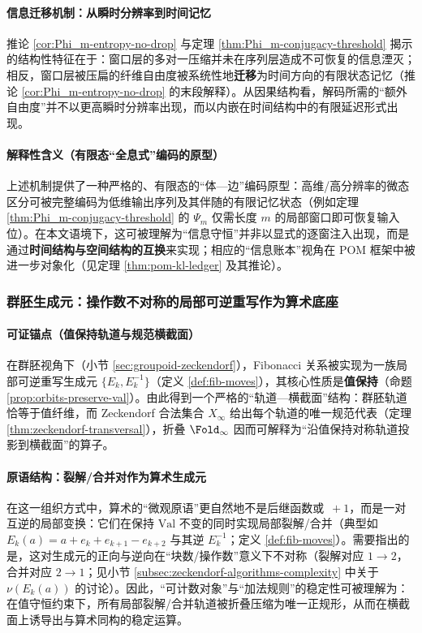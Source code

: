 \paragraph{信息迁移机制：从瞬时分辨率到时间记忆}
推论 \ref{cor:Phi_m-entropy-no-drop} 与定理 \ref{thm:Phi_m-conjugacy-threshold} 揭示的结构性特征在于：窗口层的多对一压缩并未在序列层造成不可恢复的信息湮灭；相反，窗口层被压扁的纤维自由度被系统性地\textbf{迁移}为时间方向的有限状态记忆（推论 \ref{cor:Phi_m-entropy-no-drop} 的末段解释）。从因果结构看，解码所需的“额外自由度”并不以更高瞬时分辨率出现，而以内嵌在时间结构中的有限延迟形式出现。

\paragraph{解释性含义（有限态“全息式”编码的原型）}
上述机制提供了一种严格的、有限态的“体—边”编码原型：高维/高分辨率的微态区分可被完整编码为低维输出序列及其伴随的有限记忆状态（例如定理 \ref{thm:Phi_m-conjugacy-threshold} 的 \(\Psi_m\) 仅需长度 \(m\) 的局部窗口即可恢复输入位）。在本文语境下，这可被理解为“信息守恒”并非以显式的逐窗注入出现，而是通过\textbf{时间结构与空间结构的互换}来实现；相应的“信息账本”视角在 POM 框架中被进一步对象化（见定理 \ref{thm:pom-kl-ledger} 及其推论）。

\subsubsection{群胚生成元：操作数不对称的局部可逆重写作为算术底座}\label{subsubsec:insight-groupoid-generators}
\paragraph{可证锚点（值保持轨道与规范横截面）}
在群胚视角下（小节 \ref{sec:groupoid-zeckendorf}），Fibonacci 关系被实现为一族局部可逆重写生成元 \(\{E_k,E_k^{-1}\}\)（定义 \ref{def:fib-moves}），其核心性质是\textbf{值保持}（命题 \ref{prop:orbits-preserve-val}）。由此得到一个严格的“轨道—横截面”结构：群胚轨道恰等于值纤维，而 Zeckendorf 合法集合 \(X_\infty\) 给出每个轨道的唯一规范代表（定理 \ref{thm:zeckendorf-transversal}），折叠 \(\Fold_\infty\) 因而可解释为“沿值保持对称轨道投影到横截面”的算子。

\paragraph{原语结构：裂解/合并对作为算术生成元}
在这一组织方式中，算术的“微观原语”更自然地不是后继函数或 \(\,+1\)，而是一对互逆的局部变换：它们在保持 \(\mathrm{Val}\) 不变的同时实现局部裂解/合并（典型如 \(E_k(a)=a+e_k+e_{k+1}-e_{k+2}\) 与其逆 \(E_k^{-1}\)；定义 \ref{def:fib-moves}）。需要指出的是，这对生成元的正向与逆向在“块数/操作数”意义下不对称（裂解对应 \(1\to 2\)，合并对应 \(2\to 1\)；见小节 \ref{subsec:zeckendorf-algorithms-complexity} 中关于 \(\nu(E_k(a))\) 的讨论）。因此，“可计数对象”与“加法规则”的稳定性可被理解为：在值守恒约束下，所有局部裂解/合并轨道被折叠压缩为唯一正规形，从而在横截面上诱导出与算术同构的稳定运算。

